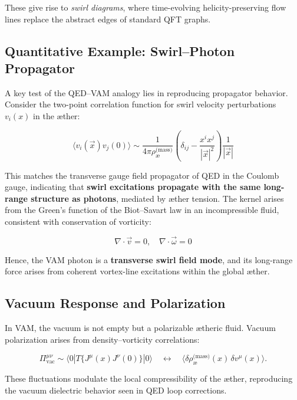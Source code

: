 These give rise to \textit{swirl diagrams}, where time-evolving helicity-preserving flow lines replace the abstract edges of standard QFT graphs.

\subsection*{Quantitative Example: Swirl–Photon Propagator}

A key test of the QED–VAM analogy lies in reproducing propagator behavior. Consider the two-point correlation function for swirl velocity perturbations \( v_i(x) \) in the æther:

\begin{equation}
\langle v_i(\vec{x}) v_j(0) \rangle
\sim \frac{1}{4\pi \rho_{\text{\ae}}^{\text{(mass)}}} \left( \delta_{ij} - \frac{x^i x^j}{|\vec{x}|^2} \right) \frac{1}{|\vec{x}|}
\end{equation}

This matches the transverse gauge field propagator of QED in the Coulomb gauge, indicating that \textbf{swirl excitations propagate with the same long-range structure as photons}, mediated by æther tension. The kernel arises from the Green’s function of the Biot–Savart law in an incompressible fluid, consistent with conservation of vorticity:

\[
\nabla \cdot \vec{v} = 0, \quad \nabla \cdot \vec{\omega} = 0
\]

Hence, the VAM photon is a \textbf{transverse swirl field mode}, and its long-range force arises from coherent vortex-line excitations within the global æther.

\subsection{Vacuum Response and Polarization}

In VAM, the vacuum is not empty but a polarizable ætheric fluid. Vacuum polarization arises from density–vorticity correlations:

\begin{equation}
\Pi^{\mu\nu}_{\text{vac}} \sim \langle 0 | T\{J^\mu(x) J^\nu(0)\} | 0 \rangle
\quad \leftrightarrow \quad
\langle \delta \rho_{\text{\ae}}^{\text{(mass)}}(x) \, \delta v^\mu(x) \rangle.
\end{equation}

These fluctuations modulate the local compressibility of the æther, reproducing the vacuum dielectric behavior seen in QED loop corrections.

